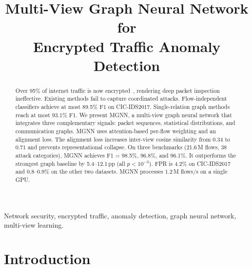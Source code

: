 \documentclass[conference]{IEEEtran}
\begin{document}
\title{\vspace{1ex}\Large\bfseries Multi-View Graph Neural Network for\\
Encrypted Traffic Anomaly Detection}

\author{
}

\maketitle


\begin{abstract}
Over 95\% of internet traffic is now encrypted~\cite{google2024https}, rendering deep packet inspection ineffective. Existing methods fail to capture coordinated attacks. Flow-independent classifiers achieve at most 89.5\% F1 on CIC-IDS2017. Single-relation graph methods reach at most 93.1\% F1. We present MGNN, a multi-view graph neural network that integrates three complementary signals: packet sequences, statistical distributions, and communication graphs. MGNN uses attention-based per-flow weighting and an alignment loss. The alignment loss increases inter-view cosine similarity from 0.34 to 0.71 and prevents representational collapse. On three benchmarks (21.6\,M flows, 38 attack categories), MGNN achieves F1 = 98.5\%, 96.8\%, and 96.1\%. It outperforms the strongest graph baseline by 5.4--12.1\,pp (all $p<10^{-3}$). FPR is 4.2\% on CIC-IDS2017 and 0.8--0.9\% on the other two datasets. MGNN processes 1.2\,M flows/s on a single GPU.

\end{abstract}

\begin{IEEEkeywords}
Network security, encrypted traffic, anomaly detection, graph neural network, multi-view learning.

\end{IEEEkeywords}


\section{Introduction}
\label{sec:intro}
\end{document}
